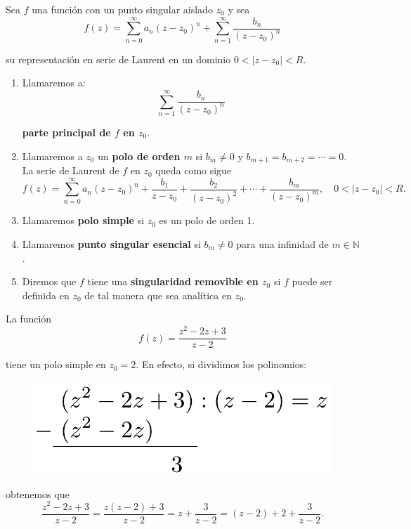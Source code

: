 \begin{defi}
Sea $f$ una función con un punto singular aislado $z_0$ y sea
$$f(z) = \sum_{n=0}^{\infty} a_n(z-z_0)^n + \sum_{n=1}^{\infty} \frac{b_n}{(z-z_0)^n}$$

su representación en serie de Laurent en un dominio $0 < |z-z_0| < R$.

\begin{enumerate}
    \item Llamaremos a:
    $$ \sum_{n=1}^{\infty} \frac{b_n}{(z-z_0)^n}$$
    
    \textbf{parte principal de $f$ en $z_0$}.
    
    \item Llamaremos a $z_0$ un \textbf{polo de orden $m$} si $b_m \neq 0$ y $b_{m+1} = b_{m+2} = \cdots = 0$. La serie de Laurent de $f$ en $z_0$ queda como sigue
    $$f(z) =  \sum_{n=0}^{\infty} a_n(z-z_0)^n +  \frac{b_1}{z-z_0} + \frac{b_2}{(z-z_0)^2} + \cdots + \frac{b_m}{(z-z_0)^m}, \quad 0 < |z-z_0| < R.$$
    
    \item Llamaremos \textbf{polo simple} si $z_0$ es un polo de orden 1.
    
    \item Llamaremos \textbf{punto singular esencial} si $b_m \neq 0$ para una infinidad de $m \in \mathbb{N}$.
    
    \item Diremos que $f$ tiene una \textbf{singularidad removible en $z_0$} si $f$ puede ser definida en $z_0$ de tal manera que sea analítica en $z_0$.
\end{enumerate}
\end{defi}

\begin{ejemplo}
La función 
$$f(z) = \frac{z^2-2z+3}{z-2}$$

tiene un polo simple en $z_0 = 2$. En efecto, si dividimos los polinomios:
\begin{figure}[H]
    \centering
    \includegraphics[scale = 0.4]{Figuras/DivisionPol.pdf}
\end{figure}

obtenemos que
$$\frac{z^2-2z+3}{z-2} = \frac{z(z-2) + 3}{z-2} = z + \frac{3}{z-2} =  (z-2) + 2 + \frac{3}{z-2}.$$
\end{ejemplo}

